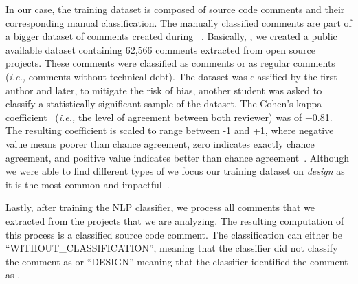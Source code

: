 In our case, the training dataset is composed of source code comments and their corresponding manual classification. The manually classified comments are part of a bigger dataset of \SATD comments created during ~\cite{Maldonado2015MTD,Maldonado2015TSE}. Basically, , we created a public available dataset containing 62,566 comments extracted from   open source projects. These comments were classified as \SATD comments or as regular comments (\textit{i.e.,} comments without technical debt). The dataset was classified by the first author and later, to mitigate the risk of bias, another student was asked to classify a statistically significant sample of the dataset. The Cohen's kappa coefficient~\cite{cohen1960coefficient} (\textit{i.e.,} the level of agreement between both reviewer) was of +0.81. The resulting coefficient is scaled to range between -1 and +1, where negative value means poorer than chance agreement, zero indicates exactly chance agreement, and positive value indicates better than chance agreement~\cite{fleiss1973equivalence}. Although we were able to find different types of \SATD {} we focus our training dataset on \emph{design \SATD} as it is the most common and impactful~\cite{Ernst2015FSE}. 

Lastly, after training the NLP classifier, we process all comments that we extracted from the projects that we are analyzing. The resulting computation of this process is a classified source code comment. The classification can either be ``WITHOUT\_CLASSIFICATION'', meaning  that the classifier did not classify the comment as \SATD or ``DESIGN'' meaning that the classifier identified the comment as \SATD.




